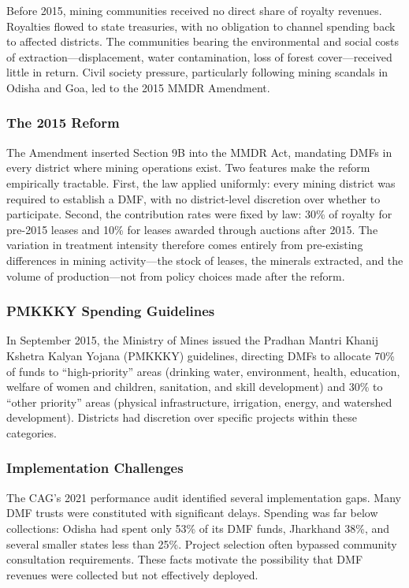 \documentclass[12pt]{article}
\begin{document}
Before 2015, mining communities received no direct share of royalty revenues. Royalties flowed to state treasuries, with no obligation to channel spending back to affected districts. The communities bearing the environmental and social costs of extraction---displacement, water contamination, loss of forest cover---received little in return. Civil society pressure, particularly following mining scandals in Odisha and Goa, led to the 2015 MMDR Amendment.

\subsubsection*{The 2015 Reform} The Amendment inserted Section 9B into the MMDR Act, mandating DMFs in every district where mining operations exist. Two features make the reform empirically tractable. First, the law applied uniformly: every mining district was required to establish a DMF, with no district-level discretion over whether to participate. Second, the contribution rates were fixed by law: 30\% of royalty for pre-2015 leases and 10\% for leases awarded through auctions after 2015. The variation in treatment intensity therefore comes entirely from pre-existing differences in mining activity---the stock of leases, the minerals extracted, and the volume of production---not from policy choices made after the reform.

\subsubsection*{PMKKKY Spending Guidelines} In September 2015, the Ministry of Mines issued the Pradhan Mantri Khanij Kshetra Kalyan Yojana (PMKKKY) guidelines, directing DMFs to allocate 70\% of funds to ``high-priority'' areas (drinking water, environment, health, education, welfare of women and children, sanitation, and skill development) and 30\% to ``other priority'' areas (physical infrastructure, irrigation, energy, and watershed development). Districts had discretion over specific projects within these categories.

\subsubsection*{Implementation Challenges} The CAG's 2021 performance audit identified several implementation gaps. Many DMF trusts were constituted with significant delays. Spending was far below collections: Odisha had spent only 53\% of its DMF funds, Jharkhand 38\%, and several smaller states less than 25\%. Project selection often bypassed community consultation requirements. These facts motivate the possibility that DMF revenues were collected but not effectively deployed.
\end{document}
